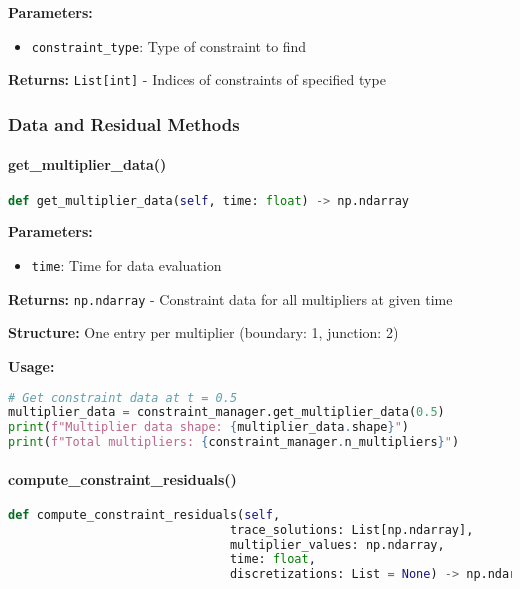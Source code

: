 \textbf{Parameters:}
\begin{itemize}
    \item \texttt{constraint\_type}: Type of constraint to find
\end{itemize}

\textbf{Returns:} \texttt{List[int]} - Indices of constraints of specified type

\subsubsection{Data and Residual Methods}

\paragraph{get\_multiplier\_data()}\leavevmode
\begin{lstlisting}[language=Python, caption=Get Multiplier Data Method]
def get_multiplier_data(self, time: float) -> np.ndarray
\end{lstlisting}

\textbf{Parameters:}
\begin{itemize}
    \item \texttt{time}: Time for data evaluation
\end{itemize}

\textbf{Returns:} \texttt{np.ndarray} - Constraint data for all multipliers at given time

\textbf{Structure:} One entry per multiplier (boundary: 1, junction: 2)

\textbf{Usage:}
\begin{lstlisting}[language=Python, caption=Get Multiplier Data Usage]
# Get constraint data at t = 0.5
multiplier_data = constraint_manager.get_multiplier_data(0.5)
print(f"Multiplier data shape: {multiplier_data.shape}")
print(f"Total multipliers: {constraint_manager.n_multipliers}")
\end{lstlisting}

\paragraph{compute\_constraint\_residuals()}\leavevmode
\begin{lstlisting}[language=Python, caption=Compute Constraint Residuals Method]
def compute_constraint_residuals(self, 
                               trace_solutions: List[np.ndarray], 
                               multiplier_values: np.ndarray, 
                               time: float,
                               discretizations: List = None) -> np.ndarray
\end{lstlisting}

